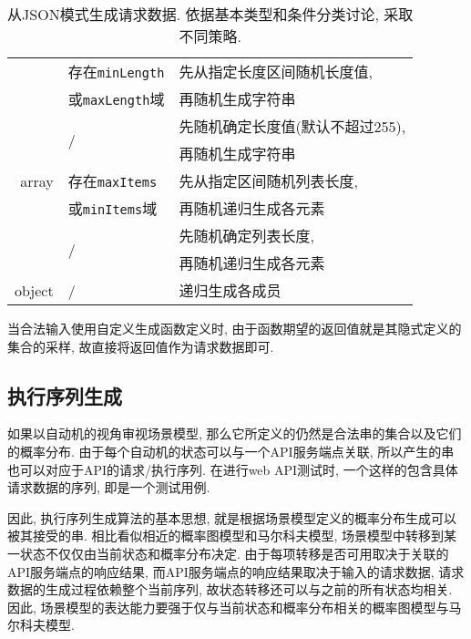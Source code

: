 \begin{table}[!htb]
\begin{tabular}{rll}
                    \cline{2-3}
                    & 存在\texttt{minLength} & 先从指定长度区间随机长度值, \\
                    & 或\texttt{maxLength}域 & 再随机生成字符串 \\
                    \cline{2-3}
                    & \multirow{2}{*}{/} & 先随机确定长度值(默认不超过255),\\
                    & & 再随机生成字符串 \\
                    \hline
                    array & 存在\texttt{maxItems} & 先从指定区间随机列表长度,\\
                    & 或\texttt{minItems}域 & 再随机递归生成各元素 \\
                    \cline{2-3}
                    & \multirow{2}{*}{/} & 先随机确定列表长度,\\
                    & & 再随机递归生成各元素 \\
                    \hline
                    object & / & 递归生成各成员 \\
                    \bottomrule
                \end{tabular}
                \caption{从JSON模式生成请求数据. 依据基本类型和条件分类讨论, 采取不同策略.}
                \label{tab:schemagen}
            \end{table}
            
            当合法输入使用自定义生成函数定义时, 由于函数期望的返回值就是其隐式定义的集合的采样, 故直接将返回值作为请求数据即可.
        
        \subsection{执行序列生成}
            如果以自动机的视角审视场景模型, 那么它所定义的仍然是合法串的集合以及它们的概率分布. 由于每个自动机的状态可以与一个API服务端点关联, 所以产生的串也可以对应于API的请求/执行序列. 在进行web API测试时, 一个这样的包含具体请求数据的序列, 即是一个测试用例.
            
            因此, 执行序列生成算法的基本思想, 就是根据场景模型定义的概率分布生成可以被其接受的串. 相比看似相近的概率图模型和马尔科夫模型, 场景模型中转移到某一状态不仅仅由当前状态和概率分布决定. 由于每项转移是否可用取决于关联的API服务端点的响应结果, 而API服务端点的响应结果取决于输入的请求数据, 请求数据的生成过程依赖整个当前序列, 故状态转移还可以与之前的所有状态均相关. 因此, 场景模型的表达能力要强于仅与当前状态和概率分布相关的概率图模型与马尔科夫模型.
            
